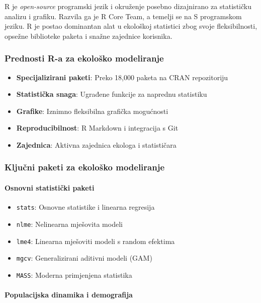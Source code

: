 \documentclass[11pt,oneside]{book}
\begin{document}
R je \textit{open-source} programski jezik i okruženje posebno dizajnirano za statističku analizu i grafiku. Razvila ga je R Core Team, a temelji se na S programskom jeziku. R je postao dominantan alat u ekološkoj statistici zbog svoje fleksibilnosti, opsežne biblioteke paketa i snažne zajednice korisnika.

\subsubsection{Prednosti R-a za ekološko modeliranje}

\begin{itemize}
	\item \textbf{Specijalizirani paketi}: Preko 18,000 paketa na CRAN repozitoriju
	\item \textbf{Statistička snaga}: Ugrađene funkcije za naprednu statistiku
	\item \textbf{Grafike}: Iznimno fleksibilna grafička mogućnosti
	\item \textbf{Reproducibilnost}: R Markdown i integracija s Git
	\item \textbf{Zajednica}: Aktivna zajednica ekologa i statističara
\end{itemize}

\subsubsection{Ključni paketi za ekološko modeliranje}

\paragraph{Osnovni statistički paketi}

\begin{itemize}
	\item \texttt{stats}: Osnovne statistike i linearna regresija
	\item \texttt{nlme}: Nelinearna mješovita modeli
	\item \texttt{lme4}: Linearna mješoviti modeli s random efektima
	\item \texttt{mgcv}: Generalizirani aditivni modeli (GAM)
	\item \texttt{MASS}: Moderna primjenjena statistika
\end{itemize}

\paragraph{Populacijska dinamika i demografija}
\end{document}
